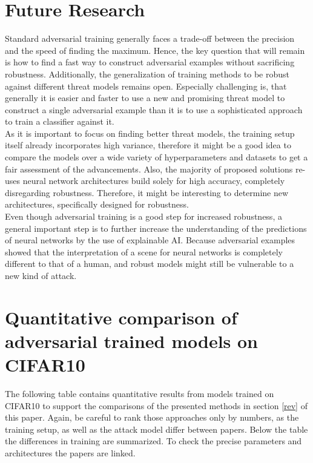 \documentclass{article}
\begin{document}
\section{Future Research}
Standard adversarial training generally faces a trade-off between the precision and the speed of finding the maximum. Hence, the key question that will remain is how to find a fast way to construct adversarial examples without sacrificing robustness. Additionally, the generalization of training methods to be robust against different threat models remains open. Especially challenging is, that generally it is easier and faster to use a new and promising threat model to construct a single adversarial example than it is to use a sophisticated approach to train a classifier against it. \\
As it is important to focus on finding better threat models, the training setup itself already incorporates high variance, therefore it might be a good idea to compare the models over a wide variety of hyperparameters and datasets to get a fair assessment of the advancements. Also, the majority of proposed solutions re-uses neural network architectures build solely for high accuracy, completely disregarding robustness. Therefore, it might be interesting to determine new architectures, specifically designed for robustness. \\
Even though adversarial training is a good step for increased robustness, a general important step is to further increase the understanding of the predictions of neural networks by the use of explainable AI. Because adversarial examples showed that the interpretation of a scene for neural networks is completely different to that of a human, and robust models might still be vulnerable to a new kind of attack.  

\newpage

\appendix
\section{Quantitative comparison of adversarial trained models on CIFAR10}
The following table contains quantitative results from models trained on CIFAR10 to support the comparisons of the presented methods in section \ref{rev} of this paper. Again, be careful to rank those approaches only by numbers, as the training setup, as well as the attack model differ between papers. Below the table the differences in training are summarized. To check the precise parameters and architectures the papers are linked.
\vspace*{-0.2cm}
\end{document}
